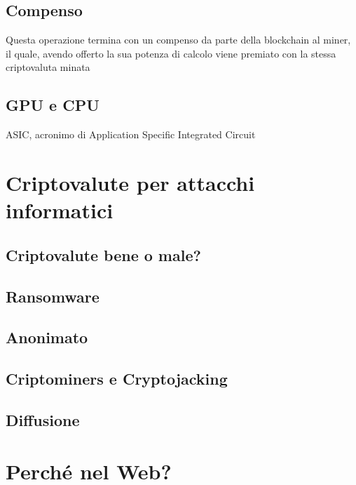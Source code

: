 \documentclass[11pt]{article}
\begin{document}
\subsection{Compenso}
\label{sec:orge737275}
Questa operazione termina con un compenso da parte della blockchain al miner, il quale, avendo offerto la sua potenza di calcolo viene premiato con la stessa criptovaluta minata
\subsection{GPU e CPU}
\label{sec:orgb78756f}
ASIC, acronimo di Application Specific Integrated Circuit
\section{Criptovalute per attacchi informatici}
\label{sec:org9e0f7ac}
\subsection{Criptovalute bene o male?}
\label{sec:orgb984807}
\subsection{Ransomware}
\label{sec:org7ccc772}
\subsection{Anonimato}
\label{sec:org209e76b}
\subsection{Criptominers e Cryptojacking}
\label{sec:org0eb10a0}
\subsection{Diffusione}
\label{sec:org86fe4f1}
\section{Perché nel Web?}
\label{sec:orgad2b818}
\end{document}
